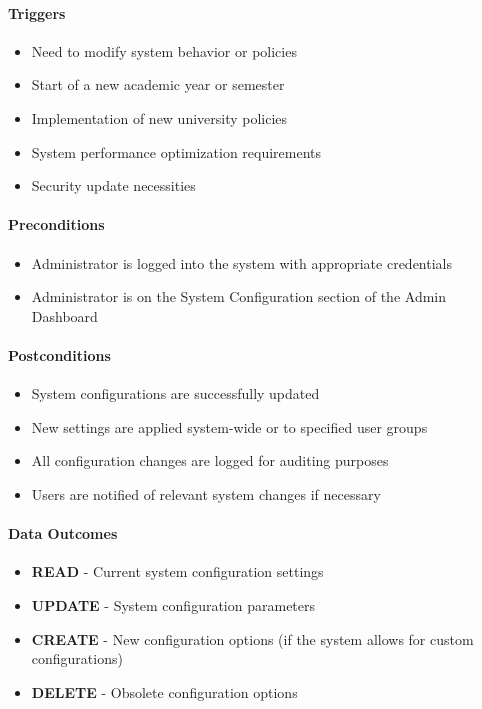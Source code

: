 \paragraph{Triggers}
\begin{itemize}
    \item Need to modify system behavior or policies
    \item Start of a new academic year or semester
    \item Implementation of new university policies
    \item System performance optimization requirements
    \item Security update necessities
\end{itemize}

\paragraph{Preconditions}
\begin{itemize}
    \item Administrator is logged into the system with appropriate credentials
    \item Administrator is on the System Configuration section of the Admin Dashboard
\end{itemize}

\paragraph{Postconditions}
\begin{itemize}
    \item System configurations are successfully updated
    \item New settings are applied system-wide or to specified user groups
    \item All configuration changes are logged for auditing purposes
    \item Users are notified of relevant system changes if necessary
\end{itemize}

\paragraph{Data Outcomes}
\begin{itemize}
    \item \textbf{READ} - Current system configuration settings
    \item \textbf{UPDATE} - System configuration parameters
    \item \textbf{CREATE} - New configuration options (if the system allows for custom configurations)
    \item \textbf{DELETE} - Obsolete configuration options
\end{itemize}